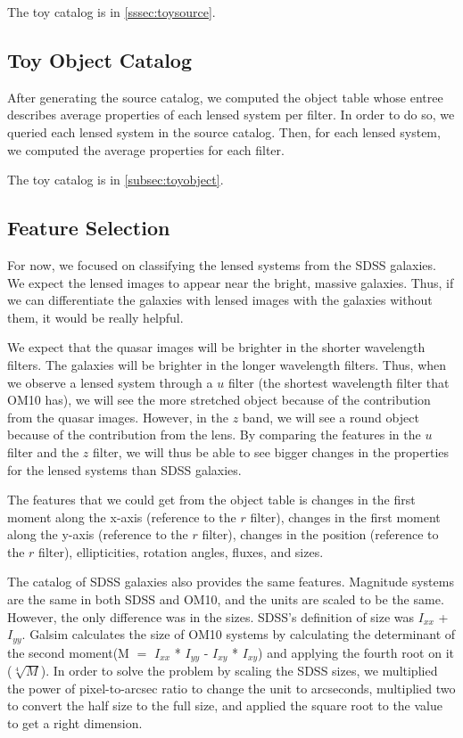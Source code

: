 \documentclass[\docopts]{\docclass}
\begin{document}
The toy catalog is in \ref{sssec:toysource}.

\subsection{Toy Object Catalog}
\label{sssec:toyobject}

After generating the source catalog, we computed the object table whose entree describes average properties of each lensed system per filter. In order to do so, we queried each lensed system in the source catalog. Then, for each lensed system, we computed the average properties for each filter.

The toy catalog is in \ref{subsec:toyobject}.

\subsection{Feature Selection}
\label{subsec:feature}

For now, we focused on classifying the lensed systems from the SDSS galaxies. We expect the lensed images to appear near the bright, massive galaxies. Thus, if we can differentiate the galaxies with lensed images with the galaxies without them, it would be really helpful.

We expect that the quasar images will be brighter in the shorter wavelength filters. The galaxies will be brighter in the longer wavelength filters. Thus, when we observe a lensed system through a $u$ filter (the shortest wavelength filter that OM10 has), we will see the more stretched object because of the contribution from the quasar images. However, in the $z$ band, we will see a round object because of the contribution from the lens. By comparing the features in the $u$ filter and the $z$ filter, we will thus be able to see bigger changes in the properties for the lensed systems than SDSS galaxies.

The features that we could get from the object table is changes in the first moment along the x-axis (reference to the $r$ filter), changes in the first moment along the y-axis (reference to the $r$ filter), changes in the position (reference to the $r$ filter), ellipticities, rotation angles, fluxes, and sizes.

The catalog of SDSS galaxies also provides the same features. Magnitude systems are the same in both SDSS and OM10, and the units are scaled to be the same. However, the only difference was in the sizes. SDSS's definition of size was $I_{xx}$ + $I_{yy}$. Galsim calculates the size of OM10 systems by calculating the determinant of the second moment(M $=$ $I_{xx}$ * $I_{yy}$ - $I_{xy}$ * $I_{xy}$) and applying the fourth root on it ($\sqrt[4]{M}$). In order to solve the problem by scaling the SDSS sizes, we multiplied the power of pixel-to-arcsec ratio to change the unit to arcseconds, multiplied two to convert the half size to the full size, and applied the square root to the value to get a right dimension.
\end{document}
